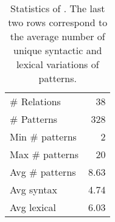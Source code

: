 \begin{table}[t]
    \centering
\begin{tabular}{lr}
  \toprule
    \# Relations &   38 \\
    \# Patterns & 328 \\
    \midrule
 Min \# patterns &    2 \\
 Max \# patterns &   20 \\
 Avg \# patterns &    8.63 \\
 \midrule
   Avg syntax &    4.74 \\
  Avg lexical &    6.03 \\
\bottomrule
\end{tabular}
    \caption{Statistics of \resource{}. 
    The last two rows correspond to the average number of unique syntactic and lexical variations of patterns.}
    \label{tab:rel-graph-stats}
    
    \vspace{-0.1in}
\end{table}
